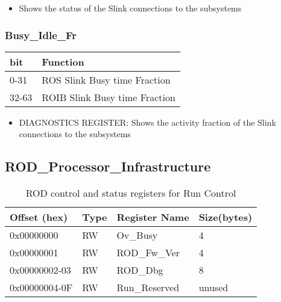 \begin{itemize}
\item Shows the status of the Slink connections to the subsystems
\end{itemize}




\subsubsection{Busy\_Idle\_Fr}

\begin {table}[H]
\begin{center}
\begin{tabular}{|l|l|}
\hline
\textbf{bit} & \textbf{Function} \\
\hline
0-31 & ROS Slink Busy time Fraction \\
\hline
32-63 & ROIB Slink Busy time Fraction \\
\hline
\end{tabular}
\end{center}
\end{table}


\begin{itemize}
\item DIAGNOSTICS REGISTER: Shows the activity fraction of the Slink connections to the subsystems
\end{itemize}








\subsection{ROD\_Processor\_Infrastructure}
%
\begin {table}[H]
\begin{center}
\caption {ROD control and status registers for Run Control}
\label{rod_control_run}
\begin{tabular}{|l|l|l|l|}
\hline
Offset (hex)& Type & Register Name & Size(bytes)\\
\hline
0x00000000 & RW & Ov\_Busy & 4 \\
\hline
0x00000001 & RW & ROD\_Fw\_Ver & 4 \\
\hline
0x00000002-03 & RW & ROD\_Dbg & 8 \\
\hline
0x00000004-0F & RW & Run\_Reserved & unused \\
\hline
\end{tabular}
\end{center}
\end{table}


